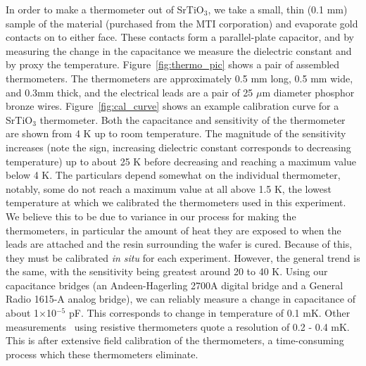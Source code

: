\documentclass{thesis-umich}
\begin{document}
In order to make a thermometer out of SrTiO$_3$, we take a small, thin (0.1 mm)
sample of the material (purchased from the MTI corporation)\cite{MTICorp} and
evaporate gold contacts on to either face.  These contacts form a parallel-plate
capacitor, and by measuring the change in the capacitance we measure the
dielectric constant and by proxy the temperature.  Figure~\ref{fig:thermo_pic} shows
a pair of assembled thermometers.  The thermometers are approximately 0.5 mm
long, 0.5 mm wide, and 0.3mm thick, and the electrical leads are a pair of 25
$\mu$m diameter phosphor bronze wires.  Figure~\ref{fig:cal_curve} shows an example
calibration curve for a SrTiO$_3$ thermometer. Both the capacitance and
sensitivity of the thermometer are shown from 4 K up to room temperature. The
magnitude of the sensitivity increases (note the sign, increasing dielectric
constant corresponds to decreasing temperature) up to about 25 K before
decreasing and reaching a maximum value below 4 K. The particulars depend
somewhat on the individual thermometer, notably, some do not reach a maximum
value at all above 1.5 K, the lowest temperature at which we calibrated the
thermometers used in this experiment. We believe this to be due to variance in
our process for making the thermometers, in particular the amount of heat they
are exposed to when the leads are attached and the resin surrounding the wafer
is cured. Because of this, they must be calibrated \textit{in situ} for each
experiment.  However, the general trend is the same, with the sensitivity being
greatest around 20 to 40 K. Using our capacitance bridges (an Andeen-Hagerling
2700A digital bridge and a General Radio 1615-A analog bridge), we can reliably
measure a change in capacitance of about 1$\times$10$^{-5}$ pF. This corresponds
to change in temperature of 0.1 mK. Other measurements~\cite{Hirschberger2015}
using resistive thermometers quote a resolution of 0.2 - 0.4 mK. This is after
extensive field calibration of the thermometers, a time-consuming process which
these thermometers eliminate.
\end{document}
